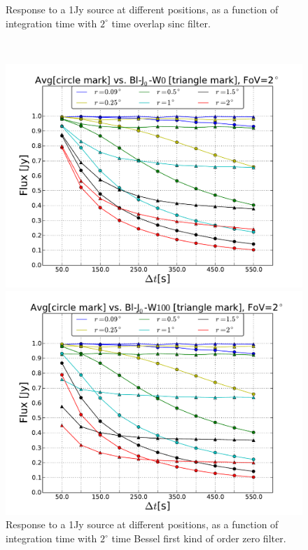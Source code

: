 \documentclass[useAMS,usenatbib]{mn2e}
\begin{document}
\begin{figure}
\begin{minipage}{0.36\linewidth}
        \caption{Response to a 1Jy source at different positions, as a function of integration time with $2^{\circ}$ time overlap sinc 
filter.}
      \label{fig:max-integ-time-sinc-w100x1-fov2}
      \end{minipage}\\
\begin{minipage}{0.36\linewidth}\includegraphics[width=1\textwidth]{./Figures/max-integ-time-bessel-w1x1-fov2.pdf}
    \caption{Response to a 1Jy source at different positions, as a function of integration time with $2^{\circ}$ time Bessel first kind of 
order zero
filter.}
    \label{fig:max-integ-time-bessel-w1x1-fov2}
    \end{minipage} 
 \hspace{1cm}
\begin{minipage}{0.36\linewidth}\includegraphics[width=1\textwidth]{./Figures/max-integ-time-bessel-w100x1-fov2.pdf}

\end{minipage}
\end{figure}
\end{document}

